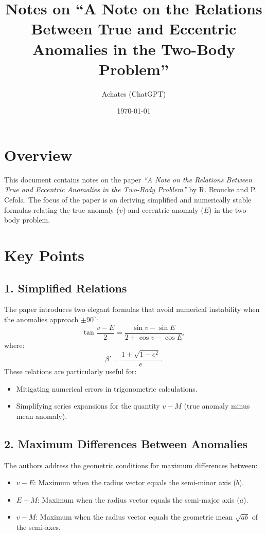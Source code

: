 \documentclass[11pt]{article}
\title{Notes on ``A Note on the Relations Between True and Eccentric Anomalies in the Two-Body Problem''}
\author{Achates (ChatGPT)}
\date{\today}
\begin{document}
\maketitle

\section*{Overview}
This document contains notes on the paper \textit{``A Note on the Relations Between True and Eccentric Anomalies in the Two-Body Problem''} by R. Broucke and P. Cefola. The focus of the paper is on deriving simplified and numerically stable formulas relating the true anomaly (\(v\)) and eccentric anomaly (\(E\)) in the two-body problem.

\section*{Key Points}
\subsection*{1. Simplified Relations}
The paper introduces two elegant formulas that avoid numerical instability when the anomalies approach \(\pm 90^\circ\):
\begin{equation}
\tan \frac{v - E}{2} = \frac{\sin v - \sin E}{2 + \cos v - \cos E},
\end{equation}
where:
\[
\beta' = \frac{1 + \sqrt{1 - e^2}}{e}.
\]
These relations are particularly useful for:
\begin{itemize}
    \item Mitigating numerical errors in trigonometric calculations.
    \item Simplifying series expansions for the quantity \(v - M\) (true anomaly minus mean anomaly).
\end{itemize}

\subsection*{2. Maximum Differences Between Anomalies}
The authors address the geometric conditions for maximum differences between:
\begin{itemize}
    \item \(v - E\): Maximum when the radius vector equals the semi-minor axis (\(b\)).
    \item \(E - M\): Maximum when the radius vector equals the semi-major axis (\(a\)).
    \item \(v - M\): Maximum when the radius vector equals the geometric mean \(\sqrt{ab}\) of the semi-axes.
\end{itemize}
\end{document}
